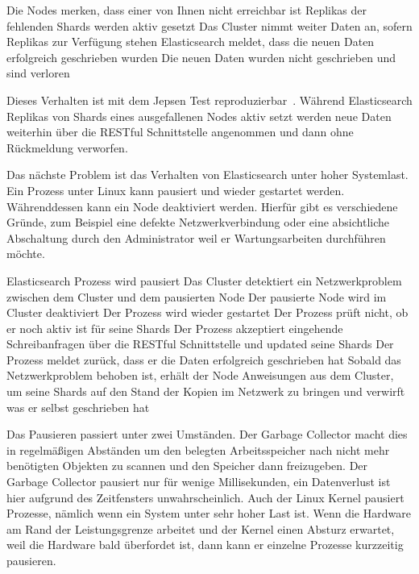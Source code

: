 \begin{outline}
  \1 Die Nodes merken, dass einer von Ihnen nicht erreichbar ist
  \1 Replikas der fehlenden Shards werden aktiv gesetzt
  \1 Das Cluster nimmt weiter Daten an, sofern Replikas zur Verfügung stehen
  \1 Elasticsearch meldet, dass die neuen Daten erfolgreich geschrieben wurden
  \1 Die neuen Daten wurden nicht geschrieben und sind verloren
\end{outline}

Dieses Verhalten ist mit dem Jepsen Test reproduzierbar~\cite{es_jepsen_iso}.
Während Elasticsearch Replikas von Shards eines ausgefallenen Nodes aktiv setzt
werden neue Daten weiterhin über die RESTful Schnittstelle angenommen und dann
ohne Rückmeldung verworfen.

Das nächste Problem ist das Verhalten von Elasticsearch unter hoher Systemlast.
Ein Prozess unter Linux kann pausiert und wieder gestartet werden.
Währenddessen kann ein Node deaktiviert werden. Hierfür gibt es verschiedene
Gründe, zum Beispiel eine defekte Netzwerkverbindung oder eine absichtliche
Abschaltung durch den Administrator weil er Wartungsarbeiten durchführen
möchte.

\begin{outline}
  \1 Elasticsearch Prozess wird pausiert
  \1 Das Cluster detektiert ein Netzwerkproblem zwischen dem Cluster und dem
  pausierten Node
  \1 Der pausierte Node wird im Cluster deaktiviert
  \1 Der Prozess wird wieder gestartet
  \1 Der Prozess prüft nicht, ob er noch aktiv ist für seine Shards
  \1 Der Prozess akzeptiert eingehende Schreibanfragen über die RESTful
  Schnittstelle und updated seine Shards
  \1 Der Prozess meldet zurück, dass er die Daten erfolgreich geschrieben hat
  \1 Sobald das Netzwerkproblem behoben ist, erhält der Node Anweisungen aus
  dem Cluster, um seine Shards auf den Stand der Kopien im Netzwerk zu bringen
  und verwirft was er selbst geschrieben hat
\end{outline}

Das Pausieren passiert unter zwei Umständen. Der \gls{Garbage Collector} macht
dies in regelmäßigen Abständen um den belegten Arbeitsspeicher nach nicht mehr
benötigten Objekten zu scannen und den Speicher dann freizugeben. Der Garbage
Collector pausiert nur für wenige Millisekunden, ein Datenverlust ist hier
aufgrund des Zeitfensters unwahrscheinlich. Auch der Linux Kernel pausiert
Prozesse, nämlich wenn ein System unter sehr hoher Last ist. Wenn die Hardware
am Rand der Leistungsgrenze arbeitet und der Kernel einen Absturz erwartet,
weil die Hardware bald überfordet ist, dann kann er einzelne Prozesse
kurzzeitig pausieren.

